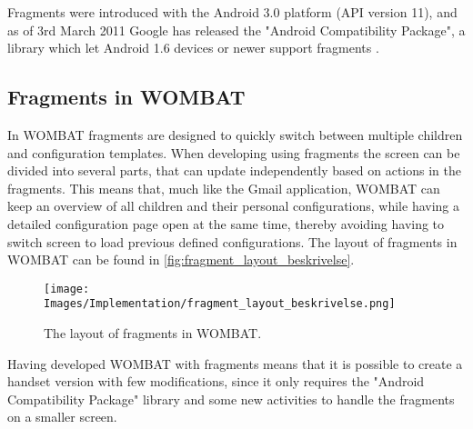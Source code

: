 Fragments were introduced with the Android 3.0 platform (API version 11), and as of 3rd March 2011 Google has released the "Android Compatibility Package", a library which let Android 1.6 devices or newer support fragments \cite{web:android:fragments:support}.
 
\subsection{Fragments in WOMBAT}
In WOMBAT fragments are designed to quickly switch between multiple children and configuration templates. When developing using fragments the screen can be divided into several parts, that can update independently based on actions in the fragments.
This means that, much like the Gmail application, WOMBAT can keep an overview of all children and their personal configurations, while having a detailed configuration page open at the same time, thereby avoiding having to switch screen to load previous defined configurations. The layout of fragments in WOMBAT can be found in \autoref{fig:fragment_layout_beskrivelse}.\\

\begin{figure}[H]
	\centering
		\texttt{[image: Images/Implementation/fragment\_layout\_beskrivelse.png]}
	\caption{The layout of fragments in WOMBAT.}
	\label{fig:fragment_layout_beskrivelse}
\end{figure}

Having developed WOMBAT with fragments means that it is possible to create a handset version with few modifications, since it only requires the "Android Compatibility Package" library and some new activities to handle the fragments on a smaller screen.